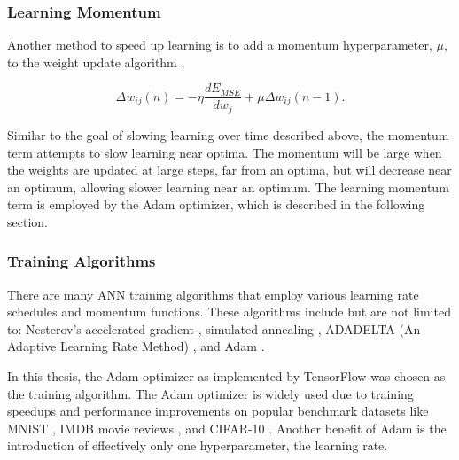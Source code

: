 \subsubsection{Learning Momentum}

Another method to speed up learning is to add a momentum hyperparameter, $\mu$, to the weight update algorithm \cite{Yu1997}, 

\begin{equation} \label{eq:update_momentum}
\Delta w_{ij}(n) = - \eta \frac{dE_{MSE}}{dw_j} +\mu \Delta w_{ij}(n-1).
\end{equation}

Similar to the goal of slowing learning over time described above, the momentum term attempts to slow learning near optima. The momentum will be large when the weights are updated at large steps, far from an optima, but will decrease near an optimum, allowing slower learning near an optimum. The learning momentum term is employed by the Adam optimizer, which is described in the following section.

\subsubsection{Training Algorithms} \label{section_training_algs}

There are many ANN training algorithms that employ various learning rate schedules and momentum functions. These algorithms include but are not limited to: Nesterov's accelerated gradient \cite{nesterov1983}, simulated annealing \cite{Kirkpatrick1983}, ADADELTA (An Adaptive Learning Rate Method) \cite{ADADELTA}, and Adam \cite{Kingma2015}. 

In this thesis, the Adam optimizer as implemented by TensorFlow \cite{tensorflow2015-whitepaper} was chosen as the training algorithm. The Adam optimizer is widely used due to training speedups and performance improvements on popular benchmark datasets like MNIST \cite{lecun98}, IMDB movie reviews \cite{Maas2011}, and CIFAR-10 \cite{Krizhevsky2009}. Another benefit of Adam is the introduction of effectively only one hyperparameter, the learning rate.

